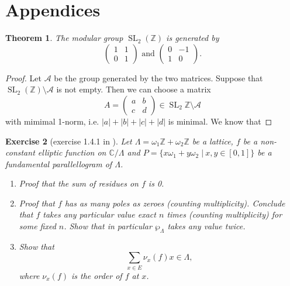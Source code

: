 \documentclass[a4paper]{article}
\theoremstyle{theoremdd}
\newtheorem{theorem}{Theorem}[section]
\theoremstyle{definitiondd}
\theoremstyle{remarkdd}
\newtheorem{exercise}[theorem]{Exercise}
\newcommand{\Z}{\mathbb{Z}}
\newcommand{\C}{\mathbb{C}}
\DeclareMathOperator{\SL}{SL}
\begin{document}
\section{Appendices}
\begin{theorem}
	The modular group $\SL_2(\Z)$ is generated by \[ 	
	\begin{pmatrix}  1 & 1 \\ 0 & 1 \end{pmatrix} 
	\text{ and }
	\begin{pmatrix} 0 & -1 \\ 1 & 0 \end{pmatrix} 
.\] 
\end{theorem}
\begin{proof}
	Let $\mathcal{A} $ be the group generated by the two matrices. 
	Suppose that $\SL_2(\Z) \setminus \mathcal{A} $ is not empty.
	Then we can choose a matrix \[
		A =\begin{pmatrix} a & b \\ c& d\end{pmatrix} \in \SL_2\Z \setminus \mathcal{A} 
	\] 
	with mimimal 1-norm, i.e. $|a| + |b| + |c| + |d|$ is minimal.
	We know that 
\end{proof}
\begin{exercise}[exercise 1.4.1 in \cite{diamondFirstCourseModular2005a}] \label{ex:1.4.1}
	Let $\Lambda = \omega_1 \Z + \omega_2 \Z$ be a lattice,  $f$ be a non-constant elliptic function on $\C / \Lambda$ and $P = \{x \omega_1 + y\omega_2 \;|\: x, y \in [0,1]\} $ be a fundamental parallellogram of $\Lambda$.
	 \begin{enumerate}
		\item Proof that the sum of residues on $f$ is 0. 
		\item Proof that $f$ has as many poles as zeroes (counting multiplicity). 
			Conclude that $f$ takes any particular value exact  $n$ times (counting multiplicity) for some fixed $n$. Show that in particular  $\wp_\Lambda$ takes any value twice.
		\item Show that 
			\[
				\sum_{x \in E} \nu_x(f) x \in \Lambda
			,\]
			where $\nu_x(f)$ is the order of $f$ at  $x$. 
	\end{enumerate}
\end{exercise}
\end{document}
